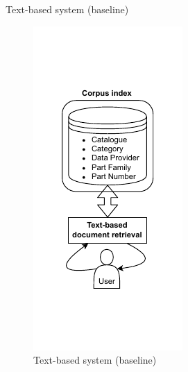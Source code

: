 \begin{frame}{Text-based system (baseline)}

    \begin{figure} [H]
        \begin{center}
            \includegraphics[scale=0.8]{images/tp-expe-text-based-sys.pdf} 
            \caption{Text-based system (baseline)} 
        \end{center}
    \end{figure}

\end{frame}

